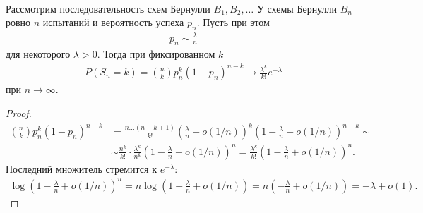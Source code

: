 \documentclass[../main.tex]{subfiles}
\begin{document}
\begin{thm}[%
 Пуассона]\
 \label{theorem:poisson}

 Рассмотрим последовательность схем Бернулли $B_1, B_2, \ldots$ У схемы Бернулли $B_n$ ровно $n$ испытаний и вероятность успеха $p_n$. Пусть при этом
 \begin{align*}
  p_n \sim \frac{\lambda}{n} 
 \end{align*} для некоторого $ \lambda > 0 $. Тогда при фиксированном $k$
 \begin{align*}
  P(S_n = k) = \binom n k p_n^{k} (1-p_n)^{n-k} \to \frac{\lambda^{k}}{k!} e^{-\lambda}
 \end{align*} при $n \to \infty$.
\end{thm}
\begin{proof}
 \begin{align*}
  \binom n k p_n^{k}(1-p_n)^{n-k} &= \frac{n\ldots(n-k+1)}{k!} \left( \frac{\lambda}{n} + o(1 / n) \right)^{k} \left(1 - \frac{\lambda}{n} + o (1 / n)\right)^{n-k} \sim \\
  & \sim \frac{n^{k}}{k!} \cdot \frac{\lambda^{k}}{n^{k}} \left( 1 - \frac{\lambda}{n} + o(1 / n) \right)^{n}  = \frac{\lambda^{k}}{k!} \left( 1 - \frac{\lambda}{n} + o(1 / n) \right)^{n}.
 \end{align*} Последний множитель стремится к $e^{-\lambda}$:
 \begin{align*}
  \log \left( 1 - \frac{\lambda}{n} + o(1 / n) \right)^{n} = n \log \left( 1 - \frac{\lambda}{n} + o(1 / n) \right) = n \left( - \frac{\lambda}{n} + o(1 / n) \right)  = - \lambda + o(1).
 \end{align*} 
\end{proof}
\end{document}
